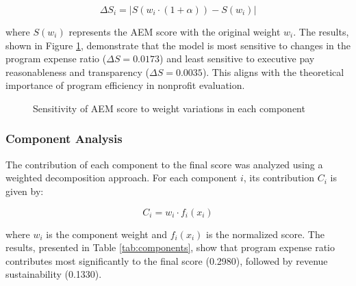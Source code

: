 \documentclass[12pt]{article}
\begin{document}
\begin{equation}
    \Delta S_i = |S(w_i \cdot (1 + \alpha)) - S(w_i)|
\end{equation}

where $S(w_i)$ represents the AEM score with the original weight $w_i$. The results, shown in Figure \ref{fig:sensitivity}, demonstrate that the model is most sensitive to changes in the program expense ratio ($\Delta S = 0.0173$) and least sensitive to executive pay reasonableness and transparency ($\Delta S = 0.0035$). This aligns with the theoretical importance of program efficiency in nonprofit evaluation.

\begin{figure}[H]
\centering
{}
\caption{Sensitivity of AEM score to weight variations in each component}
\label{fig:sensitivity}
\end{figure}

\subsubsection{Component Analysis}

The contribution of each component to the final score was analyzed using a weighted decomposition approach. For each component $i$, its contribution $C_i$ is given by:

\begin{equation}
    C_i = w_i \cdot f_i(x_i)
\end{equation}

where $w_i$ is the component weight and $f_i(x_i)$ is the normalized score. The results, presented in Table \ref{tab:components}, show that program expense ratio contributes most significantly to the final score (0.2980), followed by revenue sustainability (0.1330).
\end{document}
